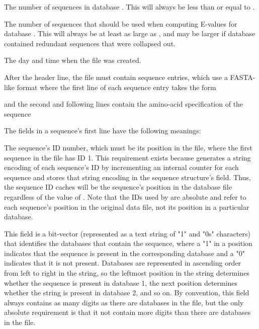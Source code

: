 \documentclass[notoc,justified]{tufte-book}    %
\begin{document}
{\begin{sreitems}{}
\item [\monob{cnt\_i}] The number of sequences in database . This will always be less than or equal to .
 
\item [\monob{fullcnt\_i}] The number of sequences that should be used when computing E-values for database .  This will always be at least as large as , and may be larger if database  contained redundant sequences that were collapsed out.

\item [\monob{date\_stamp}] The day and time when the file was created.
\end{sreitems}

After the header line, the file must contain  sequence entries, which use a FASTA-like format where the first line of each sequence entry takes the form 


and the second and following lines contain the amino-acid specification of the sequence  

The fields in a sequence's first line have the following meanings:

\begin{sreitems}{}

\item [\monob{seq\_id}] The sequence's ID number, which must be its position in the file, where the first sequence in the file has ID 1. This requirement exists because  generates a string encoding of each sequence's ID by incrementing an internal counter for each sequence and stores that string encoding in the sequence structure's  field.  Thus, the sequence ID  caches will be the sequence's position in the database file regardless of the value of .  Note that the IDs used by  are absolute and refer to each sequence's position in the original data file, not its position in a particular database.

\item [\monob{database\_membership}] This field is a bit-vector (represented as a text string of "1" and "0s" characters) that identifies the databases that contain the sequence, where a "1" in a position indicates that the sequence is present in the corresponding database and a "0" indicates that it is not present.  Databases are represented in ascending order from left to right in the string, so the leftmost position in the string determines whether the sequence is present in database 1, the next position determines whether the string is present in database 2, and so on.  By convention, this field always contains as many digits as there are databases in the file, but the only absolute requirement is that it not contain more digits than there are databases in the file.


\end{sreitems}}
\end{document}
